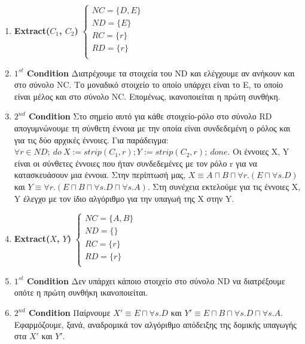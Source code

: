 \documentclass[10pt]{article}
\newcommand{\lat}{\foreignlanguage{english}}
\begin{document}
	\begin{enumerate}
		\item \textbf{\lat{Extract($C_1$, $C_2$)}} 
		$\begin{cases}
		NC = \{D, E\} \\
		ND = \{E\} \\
		RC = \{r\} \\
		RD = \{r\} \\
		\end{cases}$
		
		\item \textbf{\lat{$1^{st}$ Condition}} Διατρέχουμε τα στοιχεία του \lat{ND} και ελέγχουμε αν ανήκουν και στο σύνολο \lat{NC}. Το μοναδικό στοιχείο το οποίο υπάρχει είναι το Ε, το οποίο είναι μέλος και στο σύνολο \lat{NC}. Επομένως, ικανοποιείται η πρώτη συνθήκη.
		
		\item \textbf{\lat{$2^{nd}$ Condition}} Στο σημείο αυτό για κάθε στοιχείο-ρόλο στο σύνολο \lat{RD} απογυμνώνουμε τη σύνθετη έννοια με την οποία είναι συνδεδεμένη ο ρόλος και για τις δύο αρχικές έννοιες. Για παράδειγμα: $\forall r \in ND; \ do \ X := strip(C_1, r); Y := strip(C_2, r); \ done$. Οι έννοιες \lat{X, Y} είναι οι σύνθετες έννοιες που ήταν συνδεδεμένες με τον ρόλο \lat{r} για να κατασκευάσουν μια έννοια. Στην περίπτωσή μας, $X \equiv A \sqcap B \sqcap \forall r. (E \sqcap \forall s.D)$ και $Y \equiv \forall r.(E \sqcap B \sqcap \forall s.D \sqcap \forall s.A)$. Στη συνέχεια εκτελούμε για τις έννοιες \lat{X, Y} έλεγχο με τον ίδιο αλγόριθμο για την υπαγωή της \lat{X} στην \lat{Y}.
		
		\item \textbf{\lat{Extract($X$, $Y$)}}
		$\begin{cases}
		NC = \{A, B\} \\
		ND = \{\} \\
		RC = \{r\} \\
		RD = \{r\} \\
		\end{cases}$

		\item \textbf{\lat{$1^{st}$ Condition}} Δεν υπάρχει κάποιο στοιχείο στο σύνολο \lat{ND} να διατρέξουμε οπότε η πρώτη συνθήκη ικανοποιείται.
		
		\item \textbf{\lat{$2^{nd}$ Condition}}	Παίρνουμε $X' \equiv E \sqcap \forall s.D$ και $Y' \equiv E \sqcap B \sqcap \forall s.D \sqcap \forall s.A$. Εφαρμόζουμε, ξανά, αναδρομικά τον αλγόριθμο απόδειξης της δομικής υπαγωγής στα $X'$ και $Y'$.
		

\end{enumerate}
\end{document}
